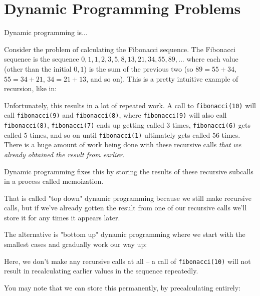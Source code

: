\section{Dynamic Programming Problems}

Dynamic programming is...

Consider the problem of calculating the Fibonacci sequence. The Fibonacci sequence is the sequence $0,1,1,2,3,5,8,13,21,34,55,89,...$ where each value (other than the initial $0,1$) is the sum of the previous two (so $89 = 55 + 34$, $55 = 34 + 21$, $34 = 21 + 13$, and so on). This is a pretty intuitive example of recursion, like in:


Unfortunately, this results in a lot of repeated work. A call to \texttt{fibonacci(10)} will call \texttt{fibonacci(9)} and \texttt{fibonacci(8)}, where \texttt{fibonacci(9)} will also call \texttt{fibonacci(8)}, \texttt{fibonacci(7)} ends up getting called 3 times, \texttt{fibonacci(6)} gets called 5 times, and so on until \texttt{fibonacci(1)} ultimately gets called 56 times. There is a huge amount of work being done with these recursive calls \textit{that we already obtained the result from earlier}.

Dynamic programming fixes this by storing the results of these recursive subcalls in a process called memoization.


That is called "top down" dynamic programming because we still make recursive calls, but if we've already gotten the result from one of our recursive calls we'll store it for any times it appears later.

The alternative is "bottom up" dynamic programming where we start with the smallest cases and gradually work our way up:


Here, we don't make any recursive calls at all -- a call of \texttt{fibonacci(10)} will not result in recalculating earlier values in the sequence repeatedly.

You may note that we can store this permanently, by precalculating entirely:

